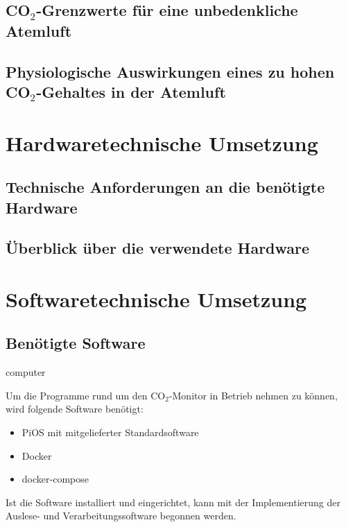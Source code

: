 \documentclass[a4paper,
    11pt,
    headings=small,
    ngerman,
    listof=totoc,
    numbers=noenddot]{scrreprt}[2021/11/13]
\begin{document}
\section{CO$_2$-Grenzwerte für eine unbedenkliche Atemluft}


\section{Physiologische Auswirkungen eines zu hohen CO$_2$-Gehaltes in der Atemluft}



\chapter{Hardwaretechnische Umsetzung}


\section{Technische Anforderungen an die benötigte Hardware}


\section{Überblick über die verwendete Hardware}



\chapter{Softwaretechnische Umsetzung}


\section{Benötigte Software}

\gls{computer}
\cite*{python}

Um die Programme rund um den CO$_2$-Monitor in Betrieb nehmen zu können, wird folgende Software benötigt:

\begin{itemize}
  \item PiOS mit mitgelieferter Standardsoftware
  \item Docker
  \item docker-compose
\end{itemize}

Ist die Software installiert und eingerichtet, kann mit der Implementierung der Auslese- und Verarbeitungssoftware begonnen werden.
\end{document}
